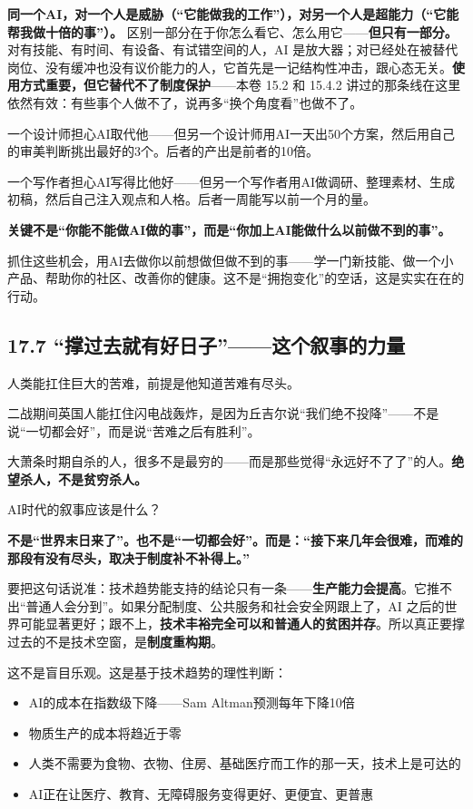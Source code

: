 \documentclass[11pt,a4paper]{ctexart}
\begin{document}
\textbf{同一个AI，对一个人是威胁（“它能做我的工作”），对另一个人是超能力（“它能帮我做十倍的事”）。} 区别一部分在于你怎么看它、怎么用它——\textbf{但只有一部分。}对有技能、有时间、有设备、有试错空间的人，AI 是放大器；对已经处在被替代岗位、没有缓冲也没有议价能力的人，它首先是一记结构性冲击，跟心态无关。\textbf{使用方式重要，但它替代不了制度保护}——本卷 15.2 和 15.4.2 讲过的那条线在这里依然有效：有些事个人做不了，说再多“换个角度看”也做不了。

一个设计师担心AI取代他——但另一个设计师用AI一天出50个方案，然后用自己的审美判断挑出最好的3个。后者的产出是前者的10倍。

一个写作者担心AI写得比他好——但另一个写作者用AI做调研、整理素材、生成初稿，然后自己注入观点和人格。后者一周能写以前一个月的量。

\textbf{关键不是“你能不能做AI做的事”，而是“你加上AI能做什么以前做不到的事”。}

抓住这些机会，用AI去做你以前想做但做不到的事——学一门新技能、做一个小产品、帮助你的社区、改善你的健康。这不是“拥抱变化”的空话，这是实实在在的行动。

\subsection{17.7 “撑过去就有好日子”——这个叙事的力量}

人类能扛住巨大的苦难，前提是他知道苦难有尽头。

二战期间英国人能扛住闪电战轰炸，是因为丘吉尔说“我们绝不投降”——不是说“一切都会好”，而是说“苦难之后有胜利”。

大萧条时期自杀的人，很多不是最穷的——而是那些觉得“永远好不了了”的人。\textbf{绝望杀人，不是贫穷杀人。}

AI时代的叙事应该是什么？

\textbf{不是“世界末日来了”。也不是“一切都会好”。而是：“接下来几年会很难，而难的那段有没有尽头，取决于制度补不补得上。”}

要把这句话说准：技术趋势能支持的结论只有一条——\textbf{生产能力会提高}。它推不出“普通人会分到”。如果分配制度、公共服务和社会安全网跟上了，AI 之后的世界可能显著更好；跟不上，\textbf{技术丰裕完全可以和普通人的贫困并存}。所以真正要撑过去的不是技术空窗，是\textbf{制度重构期}。

这不是盲目乐观。这是基于技术趋势的理性判断：

\begin{itemize}
  \item AI的成本在指数级下降——Sam Altman预测每年下降10倍
  \item 物质生产的成本将趋近于零
  \item 人类不需要为食物、衣物、住房、基础医疗而工作的那一天，技术上是可达的
  \item AI正在让医疗、教育、无障碍服务变得更好、更便宜、更普惠
\end{itemize}
\end{document}
